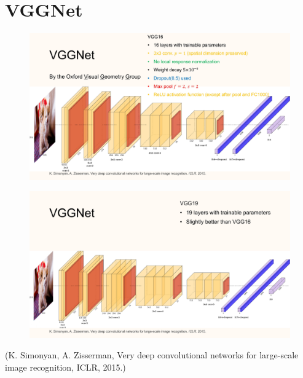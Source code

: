 \section{VGGNet}

\begin{definition}[7.8][VGGNet]
    \begin{figure}[H]
        \centering
        \includegraphics[width=1.0\textwidth]{.././assets/7.7.jpg}
    \end{figure}

    \begin{figure}[H]
        \centering
        \includegraphics[width=1.0\textwidth]{.././assets/7.8.jpg}
    \end{figure}

    (K. Simonyan, A. Zisserman, Very deep convolutional networks for large-scale image recognition, ICLR, 2015.)
\end{definition}

